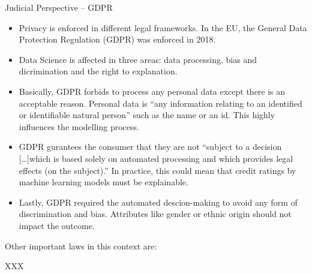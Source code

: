 \begin{vbframe}{Judicial Perspective -- GDPR}

\begin{itemize}

\item Privacy is enforced in different legal frameworks. In the EU, the General Data Protection Regulation (GDPR) was enforced in 2018. 

\item Data Science is affected in three areas: data processing, bias and dicrimination and the right to explanation.
\item Basically, GDPR forbids to process any personal data except there is an acceptable reason. Personal data is \enquote{any information relating to an identified or identifiable natural person} such as the name or an id. This highly influences the modelling process.

\item GDPR gurantees the consumer that they are not \enquote{subject to a decision […]which is based solely on automated processing and which provides legal effects (on the subject).} In practice, this could mean that credit ratings by machine learning models must be explainable. 

\item Lastly, GDPR required the automated descion-making to avoid any form of discrimination and bias. Attributes like gender or ethnic origin should not impact the outcome. 

\end{itemize}

\framebreak 

Other important laws in this context are: 

XXX


\end{vbframe}
